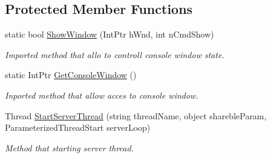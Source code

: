 \subsection*{Protected Member Functions}
\begin{DoxyCompactItemize}
\item 
static bool \mbox{\hyperlink{class_uniform_server_1_1_base_server_a16cf4f4f9de9d6d6586631640d3d867b}{Show\+Window}} (Int\+Ptr h\+Wnd, int n\+Cmd\+Show)
\begin{DoxyCompactList}\small\item\em Imported method that allo to controll console window state. \end{DoxyCompactList}\item 
static Int\+Ptr \mbox{\hyperlink{class_uniform_server_1_1_base_server_a1b7d5587de4974fad2ec366a571791e0}{Get\+Console\+Window}} ()
\begin{DoxyCompactList}\small\item\em Inported method that allow acces to console window. \end{DoxyCompactList}\item 
Thread \mbox{\hyperlink{class_uniform_server_1_1_base_server_aa4a1412b217944e7f8d6ccae6ac68289}{Start\+Server\+Thread}} (string thread\+Name, object shareble\+Param, Parameterized\+Thread\+Start server\+Loop)
\begin{DoxyCompactList}\small\item\em Method that starting server thread. \end{DoxyCompactList}\end{DoxyCompactItemize}
